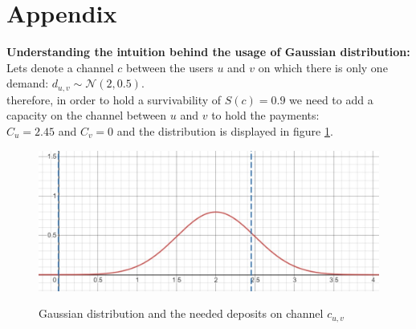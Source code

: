 \documentclass{cup-ino}
\begin{document}
\section{Appendix}
\textbf{Understanding the intuition behind the usage of Gaussian distribution:}\\
Lets denote a channel $c$ between the users $u$ and $v$ on which there is only one demand: $d_{u,v} \sim \mathcal{N}(2, 0.5) $.\\
therefore, in order to hold a survivability of $S(c) = 0.9$ we need to add a capacity on the channel between $u$ and $v$ to hold the payments:\\
$C_u = 2.45$ and $C_v=0$ and the distribution is displayed in figure \ref{fig:dist1}.
\begin{figure}[h]
\caption{Gaussian distribution and the needed deposits on channel $c_{u,v}$}
\centering
\includegraphics[scale=0.3]{Gauss_dist_1.jpeg}
\label{fig:dist1}
\end{figure}
\end{document}
